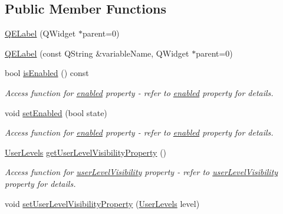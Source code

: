 \subsection*{Public Member Functions}
\begin{DoxyCompactItemize}
\item 
\hyperlink{classQELabel_a95f60ed917f9690d5f8aeaa644fb4567}{QELabel} (QWidget $\ast$parent=0)
\item 
\hyperlink{classQELabel_aced441bb20ef6954a2f12289148ea388}{QELabel} (const QString \&variableName, QWidget $\ast$parent=0)
\item 
\hypertarget{classQELabel_ad34609a35b263003fd8648379f718273}{
bool \hyperlink{classQELabel_ad34609a35b263003fd8648379f718273}{isEnabled} () const }
\label{classQELabel_ad34609a35b263003fd8648379f718273}

\begin{DoxyCompactList}\small\item\em Access function for \hyperlink{classQELabel_aeb323a7764411d7e2d3621eacb975211}{enabled} property -\/ refer to \hyperlink{classQELabel_aeb323a7764411d7e2d3621eacb975211}{enabled} property for details. \end{DoxyCompactList}\item 
\hypertarget{classQELabel_a3c9d4fa2aa42fc48d104bb83d377a9ce}{
void \hyperlink{classQELabel_a3c9d4fa2aa42fc48d104bb83d377a9ce}{setEnabled} (bool state)}
\label{classQELabel_a3c9d4fa2aa42fc48d104bb83d377a9ce}

\begin{DoxyCompactList}\small\item\em Access function for \hyperlink{classQELabel_aeb323a7764411d7e2d3621eacb975211}{enabled} property -\/ refer to \hyperlink{classQELabel_aeb323a7764411d7e2d3621eacb975211}{enabled} property for details. \end{DoxyCompactList}\item 
\hypertarget{classQELabel_a4ffb6ba29e2a38716bf408e30ceb921e}{
\hyperlink{classQELabel_ada938d547e11d1ca32786d8bb913ca8a}{UserLevels} \hyperlink{classQELabel_a4ffb6ba29e2a38716bf408e30ceb921e}{getUserLevelVisibilityProperty} ()}
\label{classQELabel_a4ffb6ba29e2a38716bf408e30ceb921e}

\begin{DoxyCompactList}\small\item\em Access function for \hyperlink{classQELabel_a8e553fceee2d1bcb5b2e6fbacbc100d6}{userLevelVisibility} property -\/ refer to \hyperlink{classQELabel_a8e553fceee2d1bcb5b2e6fbacbc100d6}{userLevelVisibility} property for details. \end{DoxyCompactList}\item 
\hypertarget{classQELabel_a6ef600e24b5faaaede19aeb71a4b8565}{
void \hyperlink{classQELabel_a6ef600e24b5faaaede19aeb71a4b8565}{setUserLevelVisibilityProperty} (\hyperlink{classQELabel_ada938d547e11d1ca32786d8bb913ca8a}{UserLevels} level)}
\label{classQELabel_a6ef600e24b5faaaede19aeb71a4b8565}


\end{DoxyCompactItemize}
